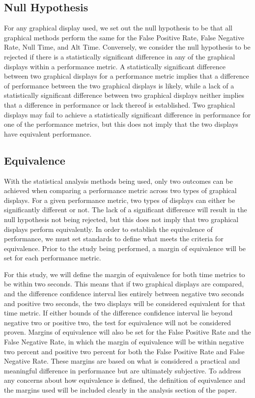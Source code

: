 \documentclass{article}
\begin{document}
\subsection{Null Hypothesis}

For any graphical display used, we set out the null hypothesis to be that all graphical methods perform the same for the False Positive Rate, False Negative Rate, Null Time, and Alt Time. Conversely, we consider the null hypothesis to be rejected if there is a statistically significant difference in any of the graphical displays within a performance metric. A statistically significant difference between two graphical displays for a performance metric implies that a difference of performance between the two graphical displays is likely, while a lack of a statistically significant difference between two graphical displays neither implies that a difference in performance or lack thereof is established. Two graphical displays may fail to achieve a statistically significant difference in performance for one of the performance metrics, but this does not imply that the two displays have equivalent performance.

\subsection{Equivalence}

With the statistical analysis methods being used, only two outcomes can be achieved when comparing a performance metric across two types of graphical displays. For a given performance metric, two types of displays can either be significantly different or not. The lack of a significant difference will result in the null hypothesis not being rejected, but this does not imply that two graphical displays perform equivalently. In order to establish the equivalence of performance, we must set standards to define what meets the criteria for equivalence. Prior to the study being performed, a margin of equivalence will be set for each performance metric.


For this study, we will define the margin of equivalence for both time metrics to be within two seconds. This means that if two graphical displays are compared, and the difference confidence interval lies entirely between negative two seconds and positive two seconds, the two displays will be considered equivalent for that time metric. If either bounds of the difference confidence interval lie beyond negative two or positive two, the test for equivalence will not be considered proven. Margins of equivalence will also be set for the False Positive Rate and the False Negative Rate, in which the margin of equivalence will be within negative two percent and positive two percent for both the False Positive Rate and False Negative Rate. These margins are based on what is considered a practical and meaningful difference in performance but are ultimately subjective. To address any concerns about how equivalence is defined, the definition of equivalence and the margins used will be included clearly in the analysis section of the paper.
\end{document}
